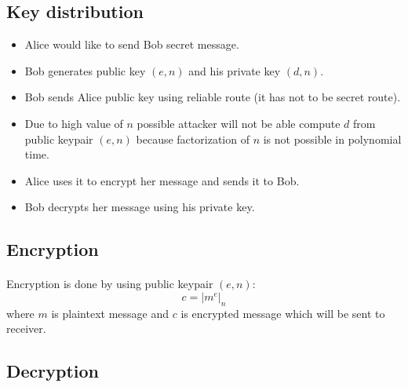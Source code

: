 \documentclass[thesis=B,english]{FITthesis}[2012/10/20]
\begin{document}
\subsection{Key distribution}
\begin{itemize}
 \item Alice would like to send Bob secret message.
 \item Bob generates public key \((e,n)\) and his private key \((d,n)\).
 \item Bob sends Alice public key using reliable route (it has not to be secret route).
 \item Due to high value of \(n\) possible attacker will not be able compute \(d\) from public keypair \((e,n)\) because factorization of \(n\) is not possible in polynomial time.
 \item Alice uses it to encrypt her message and sends it to Bob. 
 \item Bob decrypts her message using his private key.
\end{itemize}

\subsection{Encryption}
\paragraph*{}
{Encryption is done by using public keypair \((e, n)\): \[c = | m^e | _n\]
where \(m\) is plaintext message and \(c\) is encrypted message which will be sent to receiver.
}

\subsection{Decryption}
\end{document}
